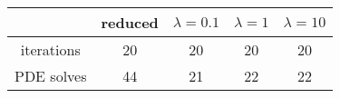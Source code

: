 \begin{tabular}{ccccc}
& reduced & $\lambda = 0.1$ & $\lambda = 1$ & $\lambda = 10$ \\
\hline
iterations & 20 & 20 & 20 & 20 \\
PDE solves & 44 & 21 & 22 & 22 \\
\hline
\end{tabular}

